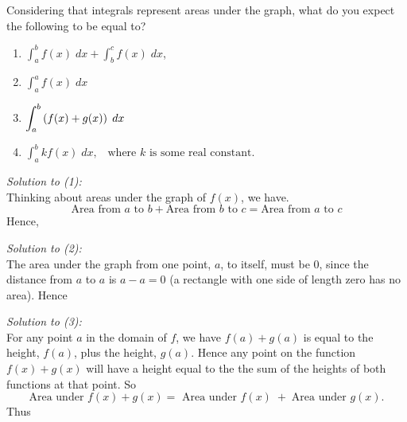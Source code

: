 \noindent Considering that integrals represent areas under the graph, what do you expect the following to be equal to?
\begin{enumerate}
\item $\displaystyle{\int_a^b f(x) \; dx + \int_b^c f(x) \; dx}$, \;\;\; 
\item $\displaystyle{\int_a^a f(x) \; dx}$
\item $\displaystyle{\int_a^b\left(f(x) + g(x)\right) \; dx}$
\item $\displaystyle{\int_a^b kf(x) \; dx}, \;\;\; \text{where $k$ is some real constant.}$
\end{enumerate}
\bigskip

\noindent \textit{Solution to (1):} \\
Thinking about areas under the graph of $f(x)$, we have.
\[
\text{Area from $a$ to $b$} + \text{Area from $b$ to $c$} = \text{Area from $a$ to $c$}
\]
Hence,

  	\bigskip
	
	\hfil{}
	\bigskip
	\bigskip

\noindent \textit{Solution to (2):} \\
The area under the graph from one point, $a$, to itself, must be $0$, since the distance from $a$ to $a$ is $a-a = 0$ (a rectangle with one side of length zero has no area). Hence

  	\bigskip
	
	\hfil{}
	\bigskip
	\bigskip


\noindent \textit{Solution to (3):} \\
For any point $a$ in the domain of $f$, we have $f(a) + g(a)$ is equal to the height, $f(a)$, plus the height, $g(a)$. Hence any point on the function $f(x) + g(x)$ will have a height equal to the the sum of the heights of both functions at that point. So
\[
\text{Area under $f(x) + g(x) = $ Area under $f(x) \;+\; $Area under $g(x)$}.
\]
Thus

